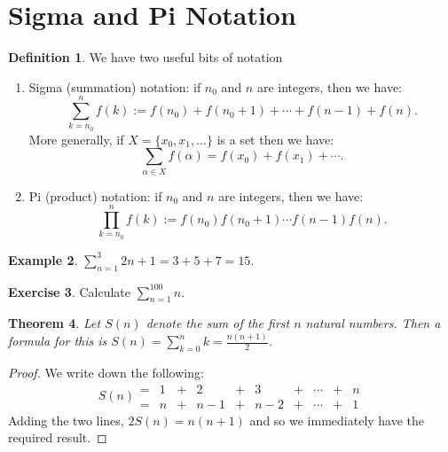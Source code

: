 \documentclass[a4paper]{amsart}
\newtheorem{thm}{Theorem}[section]
\theoremstyle{definition}
\newtheorem{defn}[thm]{Definition}
\newtheorem{ex}[thm]{Example}
\newtheorem{exercise}[thm]{Exercise}
\theoremstyle{remark}
\begin{document}
\section{Sigma and Pi Notation}
\begin{defn}
  We have two useful bits of notation
  \begin{enumerate}
    \item Sigma (summation) notation: if $ n_0 $ and $ n $ are integers, then we have:
          \begin{displaymath}
            \sum^{n}_{k = n_0} f(k) := f(n_0) + f(n_0 + 1) + \cdots + f(n - 1) + f(n).
          \end{displaymath}
          More generally, if $ X = \{x_0, x_1, \dots \} $ is a set then we have:
          \begin{displaymath}
            \sum_{\alpha \in X} f(\alpha) = f(x_0) + f(x_1) + \cdots.
          \end{displaymath}
    \item Pi (product) notation: if $ n_0 $ and $ n $ are integers, then we have:
          \begin{displaymath}
            \prod^{n}_{k = n_0} f(k) := f(n_0) f(n_0 + 1) \cdots f(n - 1) f(n).
          \end{displaymath}
  \end{enumerate}
\end{defn}

\begin{ex}
  $ \sum_{n = 1}^{3} 2n + 1 = 3 + 5 + 7 = 15 $.
\end{ex}

\begin{exercise}
  Calculate $ \sum_{n = 1}^{100} n $.
\end{exercise}

\begin{thm}
  Let $ S(n) $ denote the sum of the first $ n $ natural numbers. Then a formula for this is $ S(n) = \sum_{k = 0}^n k = \frac{n(n+1)}{2} $.
\end{thm}
\begin{proof}
  We write down the following:
  \begin{displaymath}
    S(n) \begin{array}{cccccccccc}
           = & 1 &+& 2 &+& 3 &+& \cdots &+& n\\
           = & n &+& n-1 &+& n-2 &+& \cdots &+& 1
         \end{array}
  \end{displaymath}
  Adding the two lines, $ 2S(n) = n(n+1) $ and so we immediately have the required result.
\end{proof}
\end{document}
